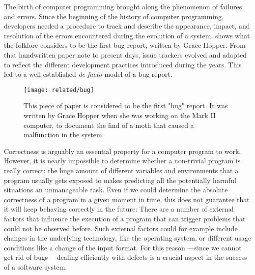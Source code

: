

The birth of computer programming brought along the phenomenon of failures and errors.
Since the beginning of the history of computer programming, developers needed a procedure to track and describe the appearance, impact, and resolution of the errors encountered during the evolution of a system.
 shows what the folklore considers to be the first bug report, written by Grace Hopper.
From that handwritten paper note to present days, issue trackers evolved and adapted to reflect the different development practices introduced during the years.
This led to a well established \emph{de facto} model of a bug report.

\begin{figure}[hb]
\centering
  \texttt{[image: related/bug]}
  \caption[The first "bug" report.]{This piece of paper is considered to be the first "bug" report. It was written by Grace Hopper when she was working on the Mark II computer, to document the find of a moth that caused a malfunction in the system.}
  \label{fig:first-bug-report}
\end{figure}

\pagebreak

Correctness is arguably an essential property for a computer program to work.
However, it is nearly impossible to determine whether a non-trivial program is really correct: the huge amount of different variables and environments that a program usually gets exposed to makes predicting all the potentially harmful situations an unmanageable task.
Even if we could determine the absolute correctness of a program in a given moment in time, this does not guarantee that it will keep behaving correctly in the future: There are a number of external factors that influence the execution of a program that can trigger problems that could not be observed before.
Such external factors could for example include changes in the underlying technology, like the operating system, or different usage conditions like a change of the input format.
For this reason ---since we cannot get rid of bugs--- dealing efficiently with defects is a crucial aspect in the success of a software system.


